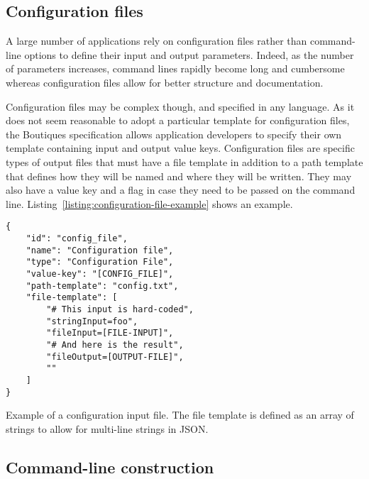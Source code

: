 \documentclass{article}
\newcommand{\boutiques}{Boutiques\xspace}
\begin{document}
\subsection{Configuration files}
\label{sec:configuration-files}
A large number of applications rely on configuration files rather than
command-line options to define their input and output
parameters. Indeed, as the number of parameters increases, command
lines rapidly become long and cumbersome whereas configuration files
allow for better structure and documentation.

Configuration files may be complex though, and specified in any
language.  As it does not seem reasonable to adopt a particular
template for configuration files, the \boutiques specification allows
application developers to specify their own template containing input
and output value keys. Configuration files are specific types of
output files that must have a file template in addition to a path
template that defines how they will be named and where they will be
written. They may also have a value key and a flag in case they need
to be passed on the command
line. Listing~\ref{listing:configuration-file-example} shows an
example.
\begin{listing}
\begin{verbatim}
{
    "id": "config_file",
    "name": "Configuration file",
    "type": "Configuration File",
    "value-key": "[CONFIG_FILE]",
    "path-template": "config.txt",
    "file-template": [
        "# This input is hard-coded",
        "stringInput=foo",
        "fileInput=[FILE-INPUT]",
        "# And here is the result",
        "fileOutput=[OUTPUT-FILE]",
        ""
    ]
}
\end{verbatim}
\caption{Example of a configuration input file. The file template is defined as
  an array of strings to allow for multi-line strings in JSON.}
\label{listing:configuration-file-example}
\end{listing}

\subsection{Command-line construction}
\end{document}
